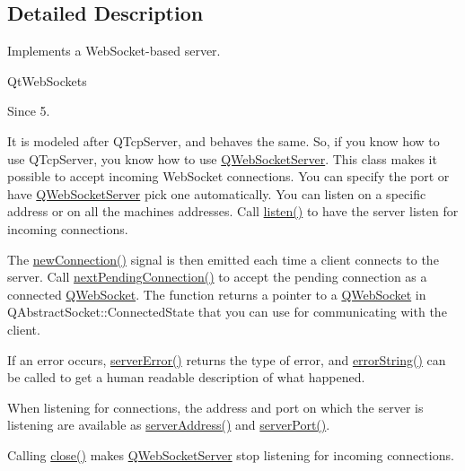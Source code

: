 \subsection{Detailed Description}
Implements a Web\+Socket-\/based server. 

Qt\+Web\+Sockets \begin{DoxySince}{Since}
5.
\end{DoxySince}
It is modeled after Q\+Tcp\+Server, and behaves the same. So, if you know how to use Q\+Tcp\+Server, you know how to use \mbox{\hyperlink{class_q_web_socket_server}{Q\+Web\+Socket\+Server}}. This class makes it possible to accept incoming Web\+Socket connections. You can specify the port or have \mbox{\hyperlink{class_q_web_socket_server}{Q\+Web\+Socket\+Server}} pick one automatically. You can listen on a specific address or on all the machine\textquotesingle{}s addresses. Call \mbox{\hyperlink{class_q_web_socket_server_a3859403d15dbb2b487a3990d68660841}{listen()}} to have the server listen for incoming connections.

The \mbox{\hyperlink{class_q_web_socket_server_ae8023d4b4b3df6884e8fe363010fba85}{new\+Connection()}} signal is then emitted each time a client connects to the server. Call \mbox{\hyperlink{class_q_web_socket_server_ad2463f7d2f2576268d193186ee516c94}{next\+Pending\+Connection()}} to accept the pending connection as a connected \mbox{\hyperlink{class_q_web_socket}{Q\+Web\+Socket}}. The function returns a pointer to a \mbox{\hyperlink{class_q_web_socket}{Q\+Web\+Socket}} in Q\+Abstract\+Socket\+::\+Connected\+State that you can use for communicating with the client.

If an error occurs, \mbox{\hyperlink{class_q_web_socket_server_ae0252a3e66f2f1c7e80b99508390df24}{server\+Error()}} returns the type of error, and \mbox{\hyperlink{class_q_web_socket_server_a7c86fee3522b6ba2aad22418fbace5bd}{error\+String()}} can be called to get a human readable description of what happened.

When listening for connections, the address and port on which the server is listening are available as \mbox{\hyperlink{class_q_web_socket_server_a8c9df0e8ad799e0ea633db852f37497a}{server\+Address()}} and \mbox{\hyperlink{class_q_web_socket_server_aafc6ff4b146c2b049df45922a2d9be7e}{server\+Port()}}.

Calling \mbox{\hyperlink{class_q_web_socket_server_aa4b5f9244c27cdd1b0c8ee830ac0c1e1}{close()}} makes \mbox{\hyperlink{class_q_web_socket_server}{Q\+Web\+Socket\+Server}} stop listening for incoming connections.

